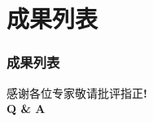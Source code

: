 \documentclass[9pt,fontset=windows]{ctexbeamer}
\begin{document}
	\section{成果列表}
	\begin{frame}[t,allowframebreaks]
		\frametitle{成果列表}
		\nocite{myCiteKey,myCiteKey2,dummy:1,dummy:2}
		\printbibliography
	\end{frame}
	
	{
		\begin{frame}
			\fontsize{22pt}{26pt}\selectfont
			\SourceHeiHeavy
			\color{bitred}
			\vspace{7cm}
			\begin{center}
				\hspace{1.5cm}感谢各位专家\quad 敬请批评指正\bf! \\ \hspace{1.5cm}Q \& A
			\end{center}
		\end{frame}
	}
\end{document}
